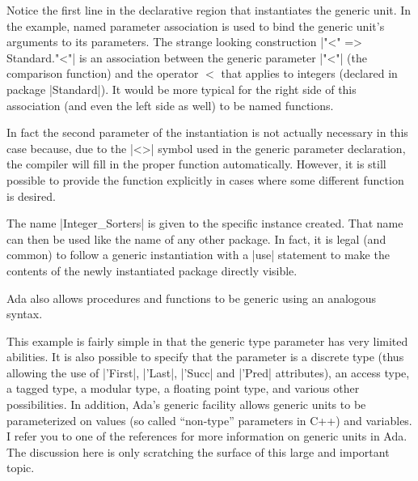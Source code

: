 Notice the first line in the declarative region that instantiates the generic unit. In the
example, named parameter association is used to bind the generic unit's arguments to its
parameters. The strange looking construction |"<" => Standard."<"| is an association between the
generic parameter |"<"| (the comparison function) and the operator $<$ that applies to integers
(declared in package |Standard|). It would be more typical for the right side of this
association (and even the left side as well) to be named functions.

In fact the second parameter of the instantiation is not actually necessary in this case
because, due to the |<>| symbol used in the generic parameter declaration, the compiler will
fill in the proper function automatically. However, it is still possible to provide the function
explicitly in cases where some different function is desired.

The name |Integer_Sorters| is given to the specific instance created. That name can then be used
like the name of any other package. In fact, it is legal (and common) to follow a generic
instantiation with a |use| statement to make the contents of the newly instantiated package
directly visible.

Ada also allows procedures and functions to be generic using an analogous syntax.

This example is fairly simple in that the generic type parameter has very limited abilities. It
is also possible to specify that the parameter is a discrete type (thus allowing the use of
|'First|, |'Last|, |'Succ| and |'Pred| attributes), an access type, a tagged type, a modular
type, a floating point type, and various other possibilities. In addition, Ada's generic
facility allows generic units to be parameterized on values (so called ``non-type'' parameters
in C++) and variables. I refer you to one of the references for more information on generic
units in Ada. The discussion here is only scratching the surface of this large and important
topic.

